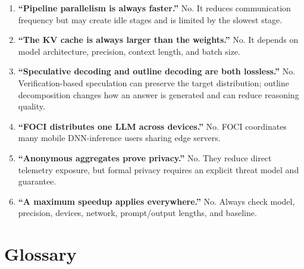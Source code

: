 \documentclass[10pt,a4paper]{article}
\begin{document}
\begin{enumerate}
  \item \textbf{``Pipeline parallelism is always faster.''} No. It reduces communication frequency but may create idle stages and is limited by the slowest stage.
  \item \textbf{``The KV cache is always larger than the weights.''} No. It depends on model architecture, precision, context length, and batch size.
  \item \textbf{``Speculative decoding and outline decoding are both lossless.''} No. Verification-based speculation can preserve the target distribution; outline decomposition changes how an answer is generated and can reduce reasoning quality.
  \item \textbf{``FOCI distributes one LLM across devices.''} No. FOCI coordinates many mobile DNN-inference users sharing edge servers.
  \item \textbf{``Anonymous aggregates prove privacy.''} No. They reduce direct telemetry exposure, but formal privacy requires an explicit threat model and guarantee.
  \item \textbf{``A maximum speedup applies everywhere.''} No. Always check model, precision, devices, network, prompt/output lengths, and baseline.
\end{enumerate}

\section{Glossary}
\end{document}
